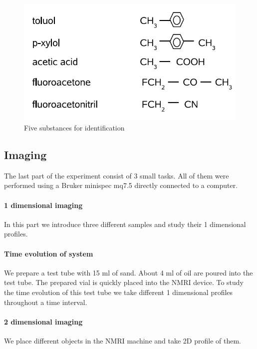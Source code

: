 \begin{figure}[!htbp]
 \begin{center}
  \includegraphics[width = .6\textwidth]{Latex images/molecules.png}
  \caption[]{Five substances for identification \footnotemark}
    \label{fig: identification}
 \end{center}
\end{figure}
\subsection{Imaging}
The last part of the experiment consist of 3 small tasks. All of them were performed using a Bruker minispec mq7.5 directly connected to a computer.
\paragraph{1 dimensional imaging}
In this part we introduce three different samples and study their 1 dimensional profiles. 
\paragraph{Time evolution of system}
We prepare a test tube with 15 ml of sand. About 4 ml of oil are poured into the test tube. The prepared vial is quickly placed into the NMRI device. To study the time evolution of this test tube we take different 1 dimensional profiles throughout a time interval. 
\paragraph{2 dimensional imaging}
We place different objects in the NMRI machine and take 2D profile of them. 

